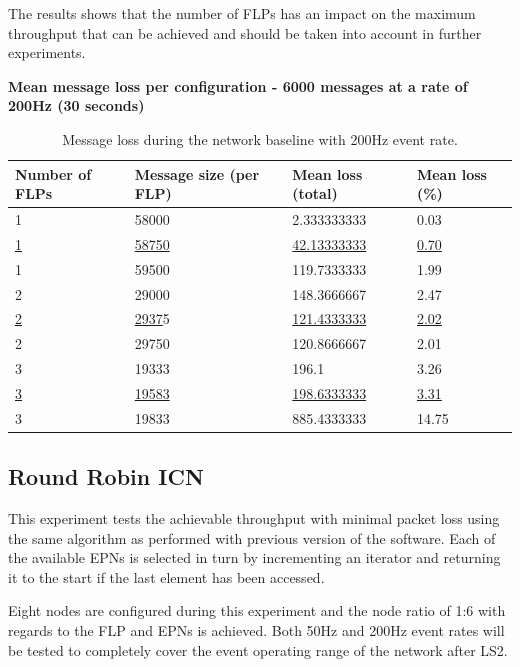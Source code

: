 \documentclass[]{article}
\begin{document}
The results shows that the number of FLPs has an impact on the maximum throughput that can be achieved and should be taken into account in further experiments. 

\begin{table}[H]
	\textbf{Mean message loss per configuration - 6000 messages at a rate of 200Hz (30 seconds)}
	\begin{center}
		\begin{tabularx}{\textwidth}{ | X | X | X | X | }
			\hline
			\textbf{Number of FLPs} & \textbf{Message size (per FLP)} & \textbf{Mean loss (total)} & \textbf{Mean loss (\%)} \\ \hline
			
			1 & 58000 & 2.333333333 & 0.03 \\ \hline
			\underline{1} & \underline{58750} & \underline{42.13333333} & \underline{0.70} \\ \hline
			1 & 59500 & 119.7333333 & 1.99 \\ \hline
			
			2 & 29000 & 148.3666667 & 2.47 \\ \hline
			\underline{2} & \underline{2937}5 & \underline{121.4333333} & \underline{2.02} \\ \hline
			2 & 29750 & 120.8666667 & 2.01 \\ \hline
			
			3 & 19333 & 196.1 & 3.26 \\ \hline
			\underline{3} & \underline{19583} & \underline{198.6333333} & \underline{3.31} \\ \hline
			3 & 19833 & 885.4333333 & 14.75 \\ \hline
		\end{tabularx}
		\caption{Message loss during the network baseline with 200Hz event rate.}
		\label{tab:resultsbaseline}
	\end{center}
\end{table}

\subsection{Round Robin ICN}
This experiment tests the achievable throughput with minimal packet loss using the same algorithm as performed with previous version of the software. Each of the available EPNs is selected in turn by incrementing an iterator and returning it to the start if the last element has been accessed. 

Eight nodes are configured during this experiment and the node ratio of 1:6 with regards to the FLP and EPNs is achieved. Both 50Hz and 200Hz event rates will be tested to completely cover the event operating range of the network after LS2.
\end{document}
